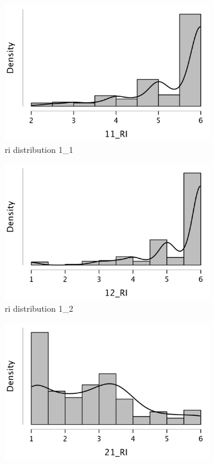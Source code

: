 \documentclass[
  a4paper,  %
  twoside,  %
  bibliography=totoc,
  headsepline,
  cleardoublepage=empty,
  parskip=half,
  draft=false
]{scrbook}
\begin{document}
\begin{figure}[h]
  \centering
  \begin{subfigure}{0.3\textwidth}
    \includegraphics[width=\linewidth]{graphics/images/statistics/RIs/11_RI.png}
    \caption{\gls{ri} distribution 1\_1}
    \label{fig:RI11}
  \end{subfigure}
  \begin{subfigure}{0.3\textwidth}
    \includegraphics[width=\linewidth]{graphics/images/statistics/RIs/12_RI.png}
    \caption{\gls{ri} distribution 1\_2}
    \label{fig:RI12}
  \end{subfigure}
  \begin{subfigure}{0.3\textwidth}
    \includegraphics[width=\linewidth]{graphics/images/statistics/RIs/21_RI.png}

\end{subfigure}
\end{figure}
\end{document}
